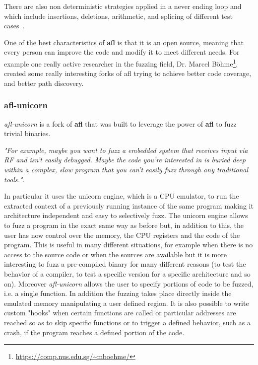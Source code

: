 \documentclass[../main.tex]{subfiles}
\begin{document}
There are also non deterministic strategies applied in a never ending loop and which include insertions, deletions, arithmetic, and splicing of different test cases~\cite{afltech}.

One of the best characteristics of \textbf{\acrshort{afl}} is that it is an open source, meaning that every person can improve the code and modify it to meet different needs. For example one really active researcher in the fuzzing field, Dr. Marcel B\"ohme\footnote{\url{https://comp.nus.edu.sg/~mboehme/}}, created some really interesting forks of afl trying to achieve better code coverage\cite{aflfast}\cite{greybf}, and better path discovery\cite{pythia}.

\subsubsection{afl-unicorn}
\label{sub:afl-unicorn}

\textit{afl-unicorn} is a fork of \textbf{\acrshort{afl}}  that was built to leverage the power of \textbf{\acrshort{afl}} to fuzz trivial binaries.

\textit{"For example, maybe you want to fuzz a embedded system that receives input via RF and isn’t easily debugged. Maybe the code you’re interested in is buried deep within a complex, slow program that you can’t easily fuzz through any traditional tools."}\cite{aflunicorn}.

In particular it uses the unicorn engine\cite{unicorn}, which is a CPU emulator, to run the extracted context of a previously running instance of the same program making it architecture independent and easy to selectively fuzz. The unicorn engine allows to fuzz a program in the exact same way as before but, in addition to this, the user has now control over the memory, the CPU registers and the code of the program. This is useful in many different situations, for example when there is no access to the source code or when the sources are available but it is more interesting to fuzz a pre-compiled binary for many different reasons (to test the behavior of a compiler, to test a specific version for a specific architecture and so on). Moreover \textit{afl-unicorn} allows the user to specify portions of code to be fuzzed, i.e. a single function. In addition the fuzzing takes place directly inside the emulated memory manipulating a user defined region. It is also possible to write custom "hooks" when certain functions are called or particular addresses are reached so as to skip specific functions or to trigger a defined behavior, such as a crash, if the program reaches a defined portion of the code.
\end{document}
